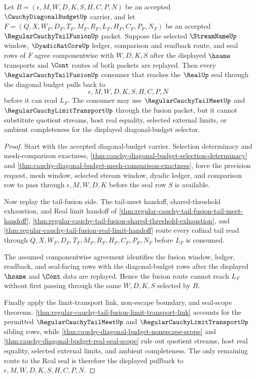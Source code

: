 \begin{theorem}
\label{thm:cauchy-diagonal-budget-tail-fusion-pullback}
Let $B=(\epsilon,M,W,D,K,S,H,C,P,N)$ be an accepted $\CauchyDiagonalBudgetUp$ carrier, and let $F=(Q,X,W_F,D_F,T_F,M_F,R_F,L_F,H_F,C_F,P_F,N_F)$ be an accepted $\RegularCauchyTailFusionUp$ packet. Suppose the selected $\StreamNameUp$ window, $\DyadicRatCoreUp$ ledger, comparison and readback route, and seal rows of $F$ agree componentwise with $W,D,K,S$ after the displayed $\hsame$ transports and $\Cont$ routes of both packets are replayed. Then every $\RegularCauchyTailFusionUp$ consumer that reaches the $\RealUp$ seal through the diagonal budget pulls back to
$$
\epsilon,M,W,D,K,S,H,C,P,N
$$
before it can read $L_F$. The consumer may use $\RegularCauchyTailMeetUp$ and $\RegularCauchyLimitTransportUp$ through the fusion packet, but it cannot substitute quotient streams, host real equality, selected external limits, or ambient completeness for the displayed diagonal-budget selector.
\end{theorem}
\begin{proof}
Start with the accepted diagonal-budget carrier. Selection determinacy and mesh-comparison exactness, \autoref{thm:cauchy-diagonal-budget-selection-determinacy} and \autoref{thm:cauchy-diagonal-budget-mesh-comparison-exactness}, force the precision request, mesh window, selected stream window, dyadic ledger, and comparison row to pass through $\epsilon,M,W,D,K$ before the seal row $S$ is available.

Now replay the tail-fusion side. The tail-meet handoff, shared-threshold exhaustion, and Real limit handoff of \autoref{thm:regular-cauchy-tail-fusion-tail-meet-handoff}, \autoref{thm:regular-cauchy-tail-fusion-shared-threshold-exhaustion}, and \autoref{thm:regular-cauchy-tail-fusion-real-limit-handoff} route every cofinal tail read through $Q,X,W_F,D_F,T_F,M_F,R_F,H_F,C_F,P_F,N_F$ before $L_F$ is consumed.

The assumed componentwise agreement identifies the fusion window, ledger, readback, and seal-facing rows with the diagonal-budget rows after the displayed $\hsame$ and $\Cont$ data are replayed. Hence the fusion route cannot reach $L_F$ without first passing through the same $W,D,K,S$ selected by $B$.

Finally apply the limit-transport link, non-escape boundary, and seal-scope theorems. \autoref{thm:regular-cauchy-tail-fusion-limit-transport-link} accounts for the permitted $\RegularCauchyTailMeetUp$ and $\RegularCauchyLimitTransportUp$ sibling rows, while \autoref{thm:cauchy-diagonal-budget-nonescape-scope} and \autoref{thm:cauchy-diagonal-budget-real-seal-scope} rule out quotient streams, host real equality, selected external limits, and ambient completeness. The only remaining route to the Real seal is therefore the displayed pullback to $\epsilon,M,W,D,K,S,H,C,P,N$.
\end{proof}

